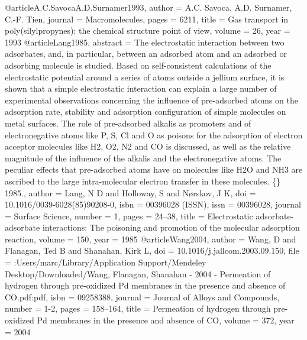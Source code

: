 @article{A.C.SavocaA.D.Surnamer1993,
author = {{A.C. Savoca, A.D. Surnamer}, C.-F. Tien},
journal = {Macromolecules},
pages = {6211},
title = {{Gas transport in poly(silylpropynes): the chemical structure point of view}},
volume = {26},
year = {1993}
}
@article{Lang1985,
abstract = {The electrostatic interaction between two adsorbates, and, in particular, between an adsorbed atom and an adsorbed or adsorbing molecule is studied. Based on self-consistent calculations of the electrostatic potential around a series of atoms outside a jellium surface, it is shown that a simple electrostatic interaction can explain a large number of experimental observations concerning the influence of pre-adsorbed atoms on the adsorption rate, stability and adsorption configuration of simple molecules on metal surfaces. The role of pre-adsorbed alkalis as promoters and of electronegative atoms like P, S, Cl and O as poisons for the adsorption of electron acceptor molecules like H2, O2, N2 and CO is discussed, as well as the relative magnitude of the influence of the alkalis and the electronegative atoms. The peculiar effects that pre-adsorbed atoms have on molecules like H2O and NH3 are ascribed to the large intra-molecular electron transfer in these molecules. {\{}{\textcopyright}{\}} 1985.},
author = {Lang, N D and Holloway, S and N{\o}rskov, J K},
doi = {10.1016/0039-6028(85)90208-0},
isbn = {00396028 (ISSN)},
issn = {00396028},
journal = {Surface Science},
number = {1},
pages = {24--38},
title = {{Electrostatic adsorbate-adsorbate interactions: The poisoning and promotion of the molecular adsorption reaction}},
volume = {150},
year = {1985}
}
@article{Wang2004,
author = {Wang, D and Flanagan, Ted B and Shanahan, Kirk L},
doi = {10.1016/j.jallcom.2003.09.150},
file = {:Users/marc/Library/Application Support/Mendeley Desktop/Downloaded/Wang, Flanagan, Shanahan - 2004 - Permeation of hydrogen through pre-oxidized Pd membranes in the presence and absence of CO.pdf:pdf},
isbn = {09258388},
journal = {Journal of Alloys and Compounds},
number = {1-2},
pages = {158--164},
title = {{Permeation of hydrogen through pre-oxidized Pd membranes in the presence and absence of CO}},
volume = {372},
year = {2004}
}
